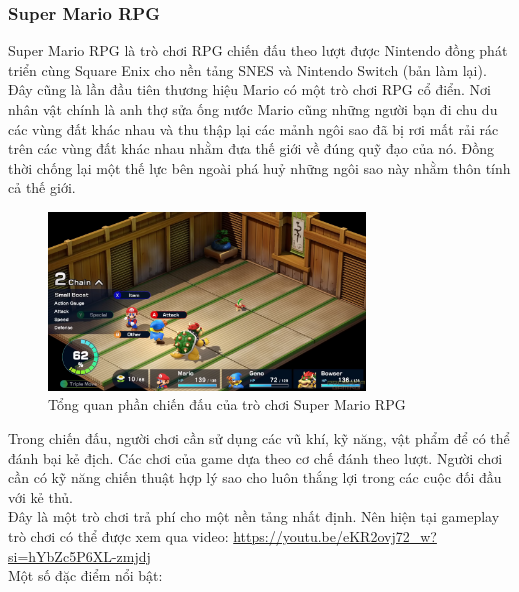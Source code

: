 \subsubsection{Super Mario RPG}
\hspace*{0.5cm} Super Mario RPG là trò chơi RPG chiến đấu theo lượt được Nintendo đồng phát triển cùng Square Enix cho nền tảng SNES và Nintendo Switch (bản làm lại). Đây cũng là lần đầu tiên thương hiệu Mario có một trò chơi RPG cổ điển. Nơi nhân vật chính là anh thợ sửa ống nước Mario cũng những người bạn đi chu du các vùng đất khác nhau và thu thập lại các mảnh ngôi sao đã bị rơi mất rải rác trên các vùng đất khác nhau nhằm đưa thế giới về đúng quỹ đạo của nó. Đồng thời chống lại một thế lực bên ngoài phá huỷ những ngôi sao này nhằm thôn tính cả thế giới.\\
\begin{figure}[H]
	\centering
	\includegraphics[width=0.75\textwidth]{Images/superMarioRPG.png}
	\vspace{0.5cm}
	\caption{Tổng quan phần chiến đấu của trò chơi Super Mario RPG}
\end{figure}
\hspace*{0.5cm} Trong chiến đấu, người chơi cần sử dụng các vũ khí, kỹ năng, vật phẩm để có thể đánh bại kẻ địch. Các chơi của game dựa theo cơ chế đánh theo lượt. Người chơi cần có kỹ năng chiến thuật hợp lý sao cho luôn thắng lợi trong các cuộc đối đầu với kẻ thủ.\\
\hspace*{0.5cm} Đây là một trò chơi trả phí cho một nền tảng nhất định. Nên hiện tại gameplay trò chơi có thể được xem qua video: \href{https://youtu.be/eKR2ovj72\_w?si=hYbZc5P6XL-zmjdj}{https://youtu.be/eKR2ovj72\_w?si=hYbZc5P6XL-zmjdj}\\
\hspace*{0.5cm} Một số đặc điểm nổi bật:
